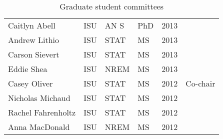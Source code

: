 \begin{table}[h]
\begin{tabular}{llllll}
  Caitlyn Abell & ISU & AN S & PhD & 2013 &  \\ 
  Andrew Lithio & ISU & STAT & MS & 2013 &  \\ 
  Carson Sievert & ISU & STAT & MS & 2013 &  \\ 
  Eddie Shea & ISU & NREM & MS & 2013 &  \\ 
  Casey Oliver & ISU & STAT & MS & 2012 & Co-chair \\ 
  Nicholas Michaud & ISU & STAT & MS & 2012 &  \\ 
  Rachel Fahrenholtz & ISU & STAT & MS & 2012 &  \\ 
  Anna MacDonald & ISU & NREM & MS & 2012 &  \\ 
   \hline
\end{tabular}
\caption{Graduate student committees} 
\label{tab:studentcommittees}
\end{table}
